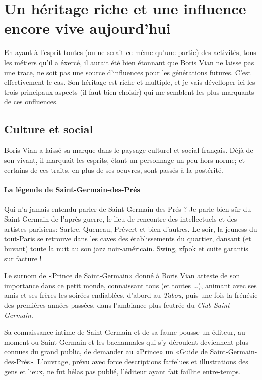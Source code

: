 
\section{Un héritage riche et une influence encore vive aujourd'hui}

En ayant à l'esprit toutes (ou ne serait-ce même qu'une partie) des activités,
tous les métiers qu'il a éxercé, il aurait été bien étonnant que Boris Vian ne
laisse pas une trace, ne soit pas une source d'influences pour les générations
futures.
C'est effectivement le cas. Son héritage est riche et multiple, et je vais
dévelloper ici les trois principaux aspects (il faut bien choisir) qui me semblent
les plus marquants de ces onfluences.

\subsection{Culture et social}

Boris Vian a laissé sa marque dans le paysage culturel et social français. Déjà
de son vivant, il marquait les esprits, étant un personnage un peu hors-norme; et
certains de ces traits, en plus de ses oeuvres, sont passés à la postérité.

\paragraph{La légende de Saint-Germain-des-Prés}

Qui n'a jamais entendu parler de Saint-Germain-des-Prés ? Je parle bien-sûr
du Saint-Germain de l'après-guerre, le lieu de rencontre des intellectuels et
des artistes parisiens: Sartre, Queneau, Prévert %
et bien d'autres. Le soir, la jeuness du tout-Paris se retrouve dans les caves
des établissements du quartier, dansant (et buvant) toute la nuit au son jazz
noir-américain. Swing, zfpok et cuite garantis sur facture !

Le surnom de «Prince de Saint-Germain» donné à Boris Vian atteste de son importance
dans ce petit monde, connaissant tous (et toutes \ldots), animant avec ses amis et
ses frères les soirées endiablées, d'abord au \emph{Tabou}, puis une fois la
frénésie des premières années passées, dans l'ambiance plus feutrée du \emph{Club
Saint-Germain}.

Sa connaissance intime de Saint-Germain et de sa faune pousse un éditeur, au moment
ou Saint-Germain et les bachannales qui s'y déroulent deviennent plus connues du
grand public, de demander au «Prince» un «Guide de Saint-Germain-des-Prés».
L'ouvrage, prévu avec force descriptions farfelues et illustrations des gens et
lieux, ne fut hélas pas publié, l'éditeur ayant fait faillite entre-temps.

